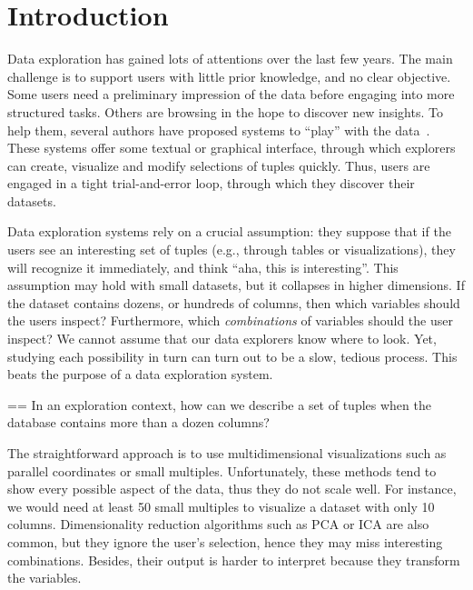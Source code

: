 \section{Introduction}
\label{sec:introdction}
Data exploration has gained lots of attentions over the last few years. The
main challenge is to support users with little prior knowledge, and no clear
objective. Some users need a preliminary impression of the data before engaging
into more structured tasks. Others are browsing in the hope to discover new
insights.  To help them, several authors have proposed systems to ``play'' with
the data~\cite{abouzied2012dataplay, sellam2013meet, liarou2014dbtouch,
dimitriadou2014explore}. These systems offer some textual or graphical
interface, through which explorers can create, visualize and modify selections of
tuples quickly. Thus, users are engaged in a tight trial-and-error loop,
through which they discover their datasets. 

Data exploration systems rely on a crucial assumption: they suppose that if the
users see an interesting set of tuples (e.g., through tables or
visualizations), they will recognize it immediately, and think ``aha, this is
interesting''. This assumption may hold with small datasets, but it collapses
in higher dimensions. If the dataset contains  dozens, or hundreds of columns,
then which variables should the users inspect? Furthermore, which
\emph{combinations} of variables should the user inspect? We cannot assume that
our data explorers know where to look.  Yet, studying each possibility in turn
can turn out to be a slow, tedious process. This beats the purpose of a data
exploration system.
\begin{framed}
    \everypar={{=\lastbox}\everypar{}}
    In an exploration context, how can we describe a set of tuples when the
    database contains more than a dozen columns?
\end{framed}

The straightforward approach is to use multidimensional visualizations such as
parallel coordinates or small multiples. Unfortunately, these methods tend to
show every possible aspect of the data, thus they do not scale well. For
instance, we would need at least 50 small multiples to visualize a dataset with
only 10 columns. Dimensionality reduction algorithms such as PCA or ICA are
also common, but they ignore the user's selection, hence they may
miss interesting combinations.  Besides, their output is harder to interpret
because they transform the variables.

